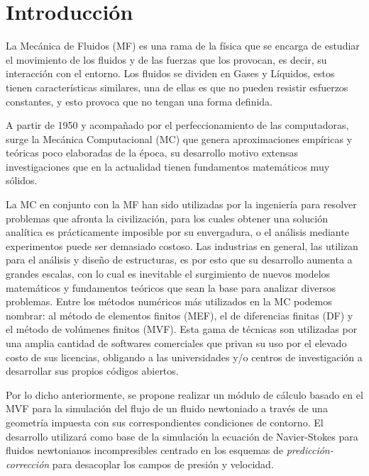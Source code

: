 \documentclass[a4paper,10pt, oneside]{book}
\begin{document}
\tableofcontents

\chapter{Introducción}

La Mecánica de Fluidos (MF) es una rama de la física que se encarga de estudiar el movimiento de los fluidos y de las fuerzas que los provocan, es decir, su interacción con el entorno. Los fluidos se dividen en Gases y Líquidos, estos tienen características similares, una de ellas es que no pueden resistir esfuerzos constantes, y esto provoca que no tengan una forma definida. 

A partir de 1950 y acompañado por el perfeccionamiento de las computadoras, surge la Mecánica Computacional (MC) que genera aproximaciones empíricas y teóricas poco elaboradas de la época, su desarrollo motivo extensas investigaciones que en la actualidad tienen fundamentos matemáticos muy sólidos. 

La MC en conjunto con la MF han sido utilizadas por la ingeniería para resolver problemas que afronta la civilización, para los cuales obtener una solución analítica es prácticamente imposible por su envergadura, o el análisis mediante experimentos puede ser demasiado costoso. Las industrias en general, las utilizan para el análisis y diseño de estructuras, es por esto que su desarrollo aumenta a grandes escalas, con lo cual es inevitable el surgimiento de nuevos modelos matemáticos y fundamentos teóricos que sean la base para analizar diversos problemas. Entre los métodos numéricos más utilizados en la MC podemos nombrar: al método de elementos finitos (MEF), el de diferencias finitas (DF) y el método de volúmenes finitos (MVF). Esta gama de técnicas son utilizadas por una amplia cantidad de softwares comerciales que privan su uso por el elevado costo de sus licencias, obligando a las universidades y/o centros de investigación a desarrollar sus propios códigos abiertos.

Por lo dicho anteriormente, se propone realizar un módulo de cálculo basado en el MVF para la simulación del flujo de un fluido newtoniado a través de una geometría impuesta con sus correspondientes condiciones de contorno. El desarrollo utilizará como base de la simulación la ecuación de Navier-Stokes para fluidos newtonianos incompresibles centrado en los esquemas de \textit{predicción-corrección} para desacoplar los campos de presión y velocidad. 
\end{document}
